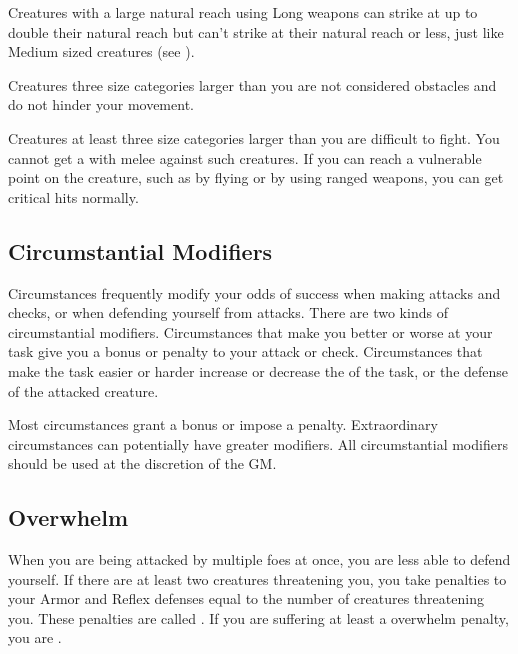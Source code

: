             Creatures with a large natural reach using Long weapons can strike at up to double their natural reach but can't strike at their natural reach or less, just like Medium sized creatures (see ).

             Creatures three size categories larger than you are not considered obstacles and do not hinder your movement.

             Creatures at least three size categories larger than you are difficult to fight. You cannot get a  with melee  against such creatures. If you can reach a vulnerable point on the creature, such as by flying or by using ranged weapons, you can get critical hits normally.

    \subsection{Circumstantial Modifiers}

        Circumstances frequently modify your odds of success when making attacks and checks, or when defending yourself from attacks.
        There are two kinds of circumstantial modifiers.
        Circumstances that make you better or worse at your task give you a bonus or penalty to your attack or check.
        Circumstances that make the task easier or harder increase or decrease the  of the task, or the defense of the attacked creature.

        Most circumstances grant a  bonus or impose a  penalty.
        Extraordinary circumstances can potentially have greater modifiers.
        All circumstantial modifiers should be used at the discretion of the GM.\@

    \subsection{Overwhelm}\label{Overwhelm}
        When you are being attacked by multiple foes at once, you are less able to defend yourself.
        If there are at least two creatures threatening you, you take penalties to your Armor and Reflex defenses equal to the number of creatures threatening you.
        These penalties are called .
        If you are suffering at least a  overwhelm penalty, you are .

